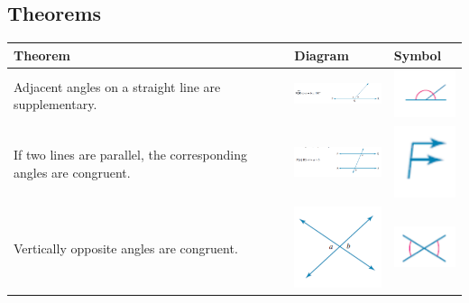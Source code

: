 \documentclass[a4paper,10pt]{report}
\begin{document}
\subsection{Theorems}
\begin{center}
	\begin{tabular}{|p{5cm}|p{3cm}|p{2cm}|}
		\hline
		Theorem                                                                                   & Diagram                                          & Symbol                                                  \\ \hline
		Adjacent angles on a straight line are supplementary.                                     & \includegraphics[width=3cm]{geometry theorem 1}  & \includegraphics[width=2cm]{geometry theorem 1 symbol}  \\
		If two lines are parallel, the corresponding angles are congruent.                        & \includegraphics[width=3cm]{geometry theorem 2}  & \includegraphics[width=2cm]{geometry theorem 2 symbol}  \\
		Vertically opposite angles are congruent.                                                 & \includegraphics[width=3cm]{geometry theorem 3}  & \includegraphics[width=2cm]{geometry theorem 3 symbol}  \\

\end{tabular}
\end{center}
\end{document}
